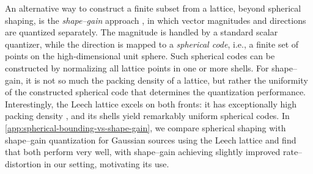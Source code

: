 \documentclass{article}
\theoremstyle{plain}
\theoremstyle{definition}
\theoremstyle{remark}
\begin{document}
An alternative way to construct a finite subset from a lattice, beyond spherical shaping, is the \textit{shape–gain} approach \citep{sabin1982product, hamkins2002gaussian}, in which vector magnitudes and directions are quantized separately. The magnitude is handled by a standard scalar quantizer, while the direction is mapped to a \textit{spherical code}, i.e., a finite set of points on the high‑dimensional unit sphere. Such spherical codes can be constructed by normalizing all lattice points in one or more shells. For shape–gain, it is not so much the packing density of a lattice, but rather the uniformity of the constructed spherical code that determines the quantization performance. Interestingly, the Leech lattice excels on both fronts: it has exceptionally high packing density \citep{conway2013sphere}, and its shells yield remarkably uniform spherical codes. In \autoref{app:spherical-bounding-vs-shape-gain}, we compare spherical shaping with shape–gain quantization for Gaussian sources using the Leech lattice and find that both perform very well, with shape–gain achieving slightly improved rate–distortion in our setting, motivating its use.
\end{document}
